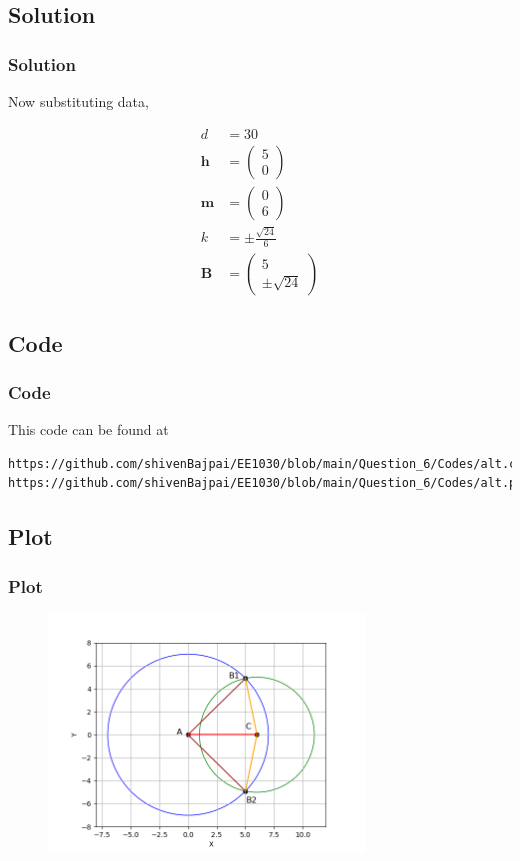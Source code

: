 \documentclass{beamer}
\theoremstyle{remark}
\newcommand{\myvec}[1]{\ensuremath{\begin{pmatrix}#1\end{pmatrix}}}
\let\vec\mathbf
\numberwithin{equation}{section}
\begin{document}
\subsection{Solution}
\begin{frame}[fragile]
\frametitle{Solution}

Now substituting data,

\begin{align*}
	d &= 30\\
	\vec{h} &= \myvec{5 \\ 0}\\
	\vec{m} &= \myvec{0 \\ 6}\\
	k &= \pm \frac{\sqrt{24}}{6}\\
	\vec{B} &= \myvec{5 \\ \pm \sqrt{24}}
\end{align*}	

\end{frame}

\subsection{Code}
\begin{frame}
	\frametitle{Code}
	This code can be found at
	{\footnotesize
	\begin{lstlisting}
https://github.com/shivenBajpai/EE1030/blob/main/Question_6/Codes/alt.c
https://github.com/shivenBajpai/EE1030/blob/main/Question_6/Codes/alt.py
	\end{lstlisting}
	}

	

	
	
\end{frame}

\subsection{Plot}
\begin{frame}[fragile]
	\frametitle{Plot}

	\begin{figure}[H]
		\centering
		\includegraphics[width=0.75\textwidth]{figs/Alt_Figure.png}
	\end{figure}
\end{frame}
\end{document}
